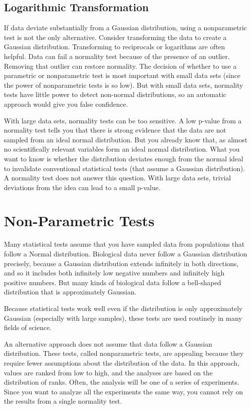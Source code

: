 \documentclass[MdouleBmain.tex]{subfiles}
\begin{document}
\subsection{Logarithmic  Transformation}

If data deviate substantially from a Gaussian distribution, using a nonparametric test is not the only alternative. Consider transforming the data to create a Gaussian distribution. Transforming to reciprocals or logarithms are often helpful.
Data can fail a normality test because of the presence of an outlier. Removing that outlier can restore normality.
The decision of whether to use a parametric or nonparametric test is most important with small data sets (since the power of nonparametric tests is so low). But with small data sets, normality tests have little power to detect non-normal distributions, so an automatic approach would give you false confidence.

With large data sets, normality tests can be too sensitive. A low p-value from a normality test tells you that there is strong evidence that the data are not sampled from an ideal normal distribution. But you already know that, as almost no scientifically relevant variables form an ideal normal distribution. What you want to know is whether the distribution deviates enough from the normal ideal to invalidate conventional statistical tests (that assume a Gaussian distribution). A normality test does not answer this question. With large data sets, trivial deviations from the idea can lead to a small p-value.



\section{Non-Parametric Tests}
Many statistical tests assume that you have sampled data from populations that follow a Normal distribution. 
Biological data never follow a Gaussian distribution precisely, because a Gaussian distribution extends infinitely in both directions, and so it includes both infinitely low negative numbers and infinitely high positive numbers. But many kinds of biological data follow a bell-shaped distribution that is approximately Gaussian. 

Because statistical tests work well even if the distribution is only approximately Gaussian (especially with large samples), these tests are used routinely in many fields of science.

An alternative approach does not assume that data follow a Gaussian distribution. These tests, called nonparametric tests, are appealing because they require fewer assumptions about the distribution of the data. In this approach, values are ranked from low to high, and the analyses are based on the distribution of ranks.
Often, the analysis will be one of a series of experiments. Since you want to analyze all the experiments the same way, you cannot rely on the results from a single normality test.
\end{document}
